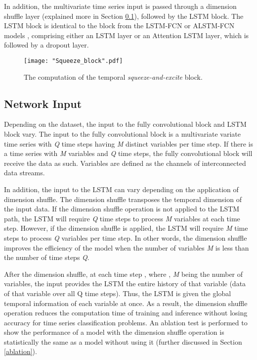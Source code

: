 \documentclass[preprint,12pt,3p]{elsarticle}
\begin{document}
In addition, the multivariate time series input is passed through a dimension shuffle layer (explained more in Section \ref{net_input}), followed by the LSTM block. The LSTM block is identical to the block from the LSTM-FCN or ALSTM-FCN models \cite{karim2017lstm}, comprising either an LSTM layer or an Attention LSTM layer, which is followed by a dropout layer. 

\begin{figure*}[htpb]
\center
\texttt{[image: "Squeeze\_block".pdf]}

\center
\caption{The computation of the temporal \textit{squeeze-and-excite} block.}
\label{fig:squeeze}

\end{figure*}







 



\subsection{Network Input}
\label{net_input}
Depending on the dataset, the input to the fully convolutional block and LSTM block vary. The input to the fully convolutional block is a multivariate variate time series with \textit{Q} time steps having \textit{M} distinct variables per time step. If there is a time series with \textit{M} variables and \textit{Q} time steps, the fully convolutional block will receive the data as such. Variables are defined as the channels of interconnected data streams.  

In addition, the input to the LSTM can vary depending on the application of dimension shuffle. The dimension shuffle transposes the temporal dimension of the input data. If the dimension shuffle operation is not applied to the LSTM path, the LSTM will require \textit{Q} time steps to process \textit{M} variables at each time step. However, if the dimension shuffle is applied, the LSTM will require \textit{M} time steps to process \textit{Q} variables per time step. In other words, the dimension shuffle improves the efficiency of the model when the number of variables \textit{M} is less than the number of time steps \textit{Q}. 


After the dimension shuffle, at each time step , where , \textit{M} being the number of variables, the input provides the LSTM the entire history of that variable (data of that variable over all Q time steps). Thus, the LSTM is given the global temporal information of each variable at once. As a result, the dimension shuffle operation reduces the computation time of training and inference without losing accuracy for time series classification problems. An ablation test is performed to show the performance of a model with the dimension shuffle operation is statistically the same as a model without using it (further discussed in Section \ref{ablation}).
\end{document}

